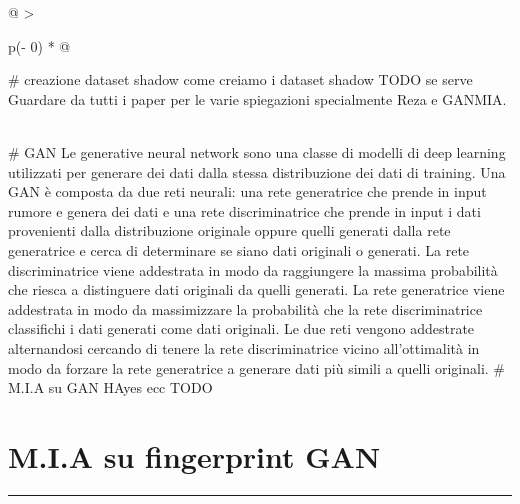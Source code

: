 \begin{longtable}[]{@{}
  >{\raggedright\arraybackslash}p{(\columnwidth - 0\tabcolsep) * }@{}}
\toprule\noalign{}
\begin{minipage}[b]{\linewidth}\raggedright
\# creazione dataset shadow come creiamo i dataset shadow TODO se serve
Guardare da tutti i paper per le varie spiegazioni specialmente Reza e
GANMIA.
\end{minipage} \\
\midrule\noalign{}
\endhead
\bottomrule\noalign{}
\endlastfoot
\# GAN Le generative neural network sono una classe di modelli di deep
learning utilizzati per generare dei dati dalla stessa distribuzione dei
dati di training. Una GAN è composta da due reti neurali: una rete
generatrice che prende in input rumore e genera dei dati e una rete
discriminatrice che prende in input i dati provenienti dalla
distribuzione originale oppure quelli generati dalla rete generatrice e
cerca di determinare se siano dati originali o generati. La rete
discriminatrice viene addestrata in modo da raggiungere la massima
probabilità che riesca a distinguere dati originali da quelli generati.
La rete generatrice viene addestrata in modo da massimizzare la
probabilità che la rete discriminatrice classifichi i dati generati come
dati originali. Le due reti vengono addestrate alternandosi cercando di
tenere la rete discriminatrice vicino all'ottimalità in modo da forzare
la rete generatrice a generare dati più simili a quelli originali. \#
M.I.A su GAN HAyes ecc TODO \\
\end{longtable}

\section{M.I.A su fingerprint GAN}\label{m.i.a-su-fingerprint-gan}

\begin{center}\rule{0.5\linewidth}{0.5pt}\end{center}
